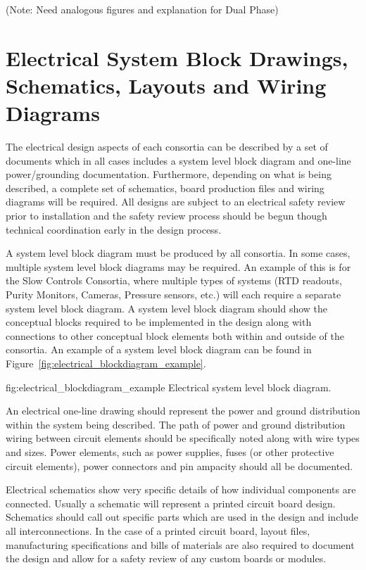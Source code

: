 (Note: Need analogous figures and explanation for Dual Phase)


\section{Electrical System Block Drawings, Schematics, Layouts and Wiring Diagrams}
\label{sec:fdsp-coord-electrical}


The electrical design aspects of each consortia can be described by a
set of documents which in all cases includes a system level block
diagram and one-line power/grounding documentation.  Furthermore,
depending on what is being described, a complete set of schematics,
board production files and wiring diagrams will be required.  All
designs are subject to an electrical safety review prior to
installation and the safety review process should be begun though
technical coordination early in the design process.

A system level block diagram must be produced by all consortia.  In
some cases, multiple system level block diagrams may be required.  An
example of this is for the Slow Controls Consortia, where multiple
types of systems (RTD readouts, Purity Monitors, Cameras, Pressure
sensors, etc.) will each require a separate system level block
diagram. A system level block diagram should show the conceptual
blocks required to be implemented in the design along with connections
to other conceptual block elements both within and outside of the
consortia.  An example of a system level block diagram can be found in
Figure~\ref{fig:electrical_blockdiagram_example}.
\begin{dunefigure}{fig:electrical_blockdiagram_example}
  {Electrical system level block diagram.}
\end{dunefigure}

An electrical one-line drawing should represent the power and ground
distribution within the system being described.  The path of power and
ground distribution wiring between circuit elements should be
specifically noted along with wire types and sizes.  Power elements,
such as power supplies, fuses (or other protective circuit elements),
power connectors and pin ampacity should all be documented.

Electrical schematics show very specific details of how individual
components are connected.  Usually a schematic will represent a
printed circuit board design.  Schematics should call out specific
parts which are used in the design and include all interconnections.
In the case of a printed circuit board, layout files, manufacturing
specifications and bills of materials are also required to document
the design and allow for a safety review of any custom boards or
modules.

